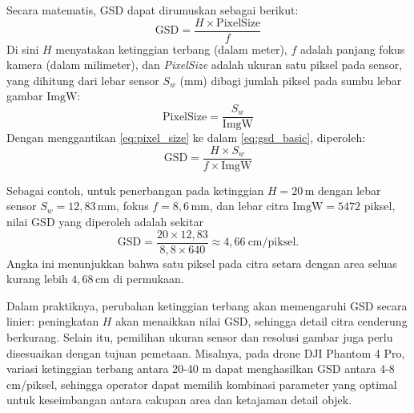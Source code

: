 Secara matematis, GSD dapat dirumuskan sebagai berikut:
\begin{equation}
  \label{eq:gsd_basic}
  \mathrm{GSD}
  = \frac{H \times \mathrm{PixelSize}}{f}
\end{equation}
Di sini $H$ menyatakan ketinggian terbang (dalam meter), $f$ adalah panjang fokus kamera (dalam milimeter), dan \emph{PixelSize} adalah ukuran satu piksel pada sensor, yang dihitung dari lebar sensor $S_w$ (mm) dibagi jumlah piksel pada sumbu lebar gambar $\mathrm{ImgW}$:
\begin{equation}
  \label{eq:pixel_size}
  \mathrm{PixelSize}
  = \frac{S_w}{\mathrm{ImgW}}
\end{equation}
Dengan menggantikan \eqref{eq:pixel_size} ke dalam \eqref{eq:gsd_basic}, diperoleh:
\begin{equation}
  \label{eq:gsd_full}
  \mathrm{GSD}
  = \frac{H \times S_w}{f \times \mathrm{ImgW}}
\end{equation}

Sebagai contoh, untuk penerbangan pada ketinggian $H = 20\,$m dengan lebar sensor $S_w = 12{,}83\,$mm, fokus $f = 8{,}6\,$mm, dan lebar citra $\mathrm{ImgW} = 5472$ piksel, nilai GSD yang diperoleh adalah sekitar
\[
  \mathrm{GSD}
  = \frac{20 \times 12{,}83}{8{,}8 \times 640}
  \approx 4{,}66\ \mathrm{cm/piksel}.
\]
Angka ini menunjukkan bahwa satu piksel pada citra setara dengan area seluas kurang lebih $4{,}68\,$cm di permukaan.

Dalam praktiknya, perubahan ketinggian terbang akan memengaruhi GSD secara linier: peningkatan $H$ akan menaikkan nilai GSD, sehingga detail citra cenderung berkurang. Selain itu, pemilihan ukuran sensor dan resolusi gambar juga perlu disesuaikan dengan tujuan pemetaan. Misalnya, pada drone DJI Phantom 4 Pro, variasi ketinggian terbang antara 20-40 m dapat menghasilkan GSD antara 4-8 cm/piksel, sehingga operator dapat memilih kombinasi parameter yang optimal untuk keseimbangan antara cakupan area dan ketajaman detail objek.



